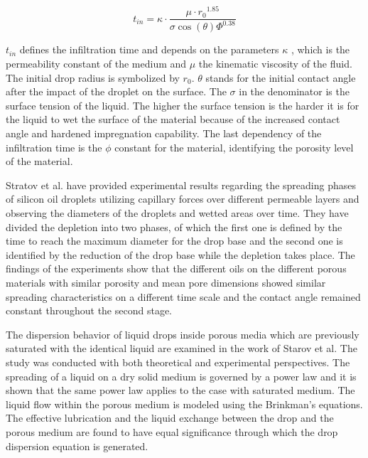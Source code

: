 \bigskip

\begin{equation}\label{eq:InfTime}
t_{in}=\kappa \cdotp {\frac{\mu \cdotp r{_0}^{1.85}}{\sigma \cos({\theta})\varPhi^{0.38}}}
\end{equation}

\bigskip

$t_{in}$ defines the infiltration time and depends on the parameters $\kappa$ , which is the permeability constant of the medium and $\mu$ the kinematic viscosity of the fluid. The initial drop radius is symbolized by $r_{0}$. $\theta$ stands for the initial contact angle after the impact of the droplet on the surface. The $\sigma$ in the denominator is the surface tension of the liquid. The higher the surface tension is the harder it is for the liquid to wet the surface of the material because of the increased contact angle and hardened impregnation capability. The last dependency of the infiltration time is  the $\phi$ constant for the material, identifying the porosity level of the material. \citep{markicevic2009infiltration}

Stratov et al. have provided experimental results regarding  the spreading phases of silicon oil droplets utilizing capillary forces over different permeable layers and observing the diameters of the droplets and wetted areas over time. They have divided the depletion into two phases, of which the first one is defined by the time to reach the maximum diameter for the drop base and the second one is identified by the reduction of the drop base while the depletion takes place. The findings of the experiments show that the different oils on the different porous materials with similar porosity and mean pore dimensions showed similar spreading characteristics on a different time scale and the contact angle remained constant throughout the second stage.\citep{starov2002thick}

The dispersion behavior of liquid drops inside porous media which are previously saturated with the identical liquid are examined in the work of Starov et al. The study was conducted with both theoretical and experimental perspectives. The spreading of a liquid on a dry solid medium is governed by a power law and it is shown that the same power law applies to the case with saturated medium. The liquid flow within the porous medium is modeled using the Brinkman’s equations. The effective lubrication and the liquid exchange between the drop and the porous medium are found to have equal significance through which the drop dispersion equation is generated. \citep{starov2002saturated}

